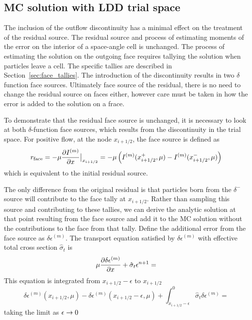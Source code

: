 \newcommand{\dep}{\ensuremath{\delta\epsilon^{(m)}}}

\subsection{MC solution with LDD trial space}
\label{sec:ldd_mc}

The inclusion of the outflow discontinuity has a minimal effect on the treatment of the
residual source. The residual source and process of estimating moments of
the error on the interior of a space-angle cell is unchanged.  The process of estimating
the solution on the outgoing face requires tallying the solution when particles leave a
cell. The specific
tallies are described in Section~\ref{sec:face_tallies}.  The introduction of the 
discontinuity results in two $\delta$ function face sources.  Ultimately
face source of the
residual, there is no need to change the residual source on faces either, however care
must be taken in how the error is added to the solution on a frace.  

To demonstrate that the residual face source is unchanged, it is necessary to look at both 
$\delta$-function face sources, which results from the discontinuity in the trial space.  For
positive flow, at the node $x_{i+1/2}$, the face source is defined as
\begin{equation}
    \label{eq:res_face}
    r_{\text{face}} = -\mu \frac{\partial I^{(m)}}{\partial x}\big|_{x_{i+1/2}} =-\mu\left( I^{(m)}(x_{i+1/2}^+,\mu) -I^{(m)}(x_{i+1/2}^-,\mu) \right)
\end{equation}
which is equivalent to the initial residual source. 

The only difference from the original residual
is that particles born from the $\delta^-$ source will contribute to the face tally at $x_{i+1/2}$.  
Rather than sampling this source and contributing to these tallies, we can derive
the analytic solution at that point resulting from the face source and add it to the MC
solution without the contributions to the face from that tally.  Define the additional error
from the face source as $\delta \epsilon^{(m)}$.  The transport equation satisfied by $\delta
\epsilon^{(m)}$ with effective total cross 
section $\hat \sigma_t$ is
\begin{equation}
    \label{eq:ho_face}
    \mu \frac{\partial \delta\epsilon^{(m)}}{\partial x} + \hat\sigma_t \epsilon^{n+1} = 
\end{equation}
This equation is integrated from $x_{i+1/2}-\epsilon$ to $x_{i+1/2}$
\begin{equation}
    \dep(x_{i+1/2},\mu) - \dep(x_{i+1/2}-\epsilon,\mu)  + \int_{x_{i+1/2}-\epsilon}^0 
      \hat \sigma_t \dep = 
\end{equation}
taking the limit as $\epsilon\rightarrow 0$



